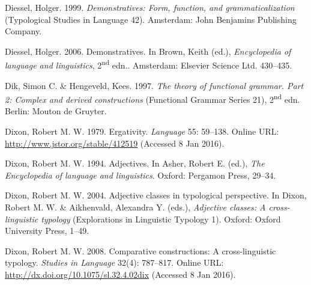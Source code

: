 \begin{styleCitaviBibliographyEntry}
Diessel, Holger. 1999. \textit{Demonstratives: Form, function, and grammaticalization} (Typological Studies in Language 42). Amsterdam: John Benjamins Publishing Company.
\end{styleCitaviBibliographyEntry}

\begin{styleCitaviBibliographyEntry}
Diessel, Holger. 2006. Demonstratives. In Brown, Keith (ed.), \textit{Encyclopedia of language and linguistics}, 2\textsuperscript{nd} edn.. Amsterdam: Elsevier Science Ltd. 430–435.
\end{styleCitaviBibliographyEntry}

\begin{styleCitaviBibliographyEntry}
Dik, Simon C. \& Hengeveld, Kees. 1997. \textit{The theory of functional grammar. Part 2: Complex and derived constructions} (Functional Grammar Series 21), 2\textsuperscript{nd} edn. Berlin: Mouton de Gruyter.
\end{styleCitaviBibliographyEntry}

\begin{styleCitaviBibliographyEntry}
Dixon, Robert M. W. 1979. Ergativity. \textit{Language} 55: 59–138. Online URL: \url{http://www.jstor.org/stable/412519} (Accessed 8 Jan 2016).
\end{styleCitaviBibliographyEntry}

\begin{styleCitaviBibliographyEntry}
Dixon, Robert M. W. 1994. Adjectives. In Asher, Robert E. (ed.), \textit{The Encyclopedia of language and linguistics}. Oxford: Pergamon Press, 29–34.
\end{styleCitaviBibliographyEntry}

\begin{styleCitaviBibliographyEntry}
Dixon, Robert M. W. 2004. Adjective classes in typological perspective. In Dixon, Robert M. W. \& Aikhenvald, Alexandra Y. (eds.), \textit{Adjective classes: A cross-linguistic typology} (Explorations in Linguistic Typology 1). Oxford: Oxford University Press, 1–49.
\end{styleCitaviBibliographyEntry}

\begin{styleCitaviBibliographyEntry}
Dixon, Robert M. W. 2008. Comparative constructions: A cross-linguistic typology. \textit{Studies in Language} 32(4): 787–817. Online URL: \url{http://dx.doi.org/10.1075/sl.32.4.02dix} (Accessed 8 Jan 2016).
\end{styleCitaviBibliographyEntry}

